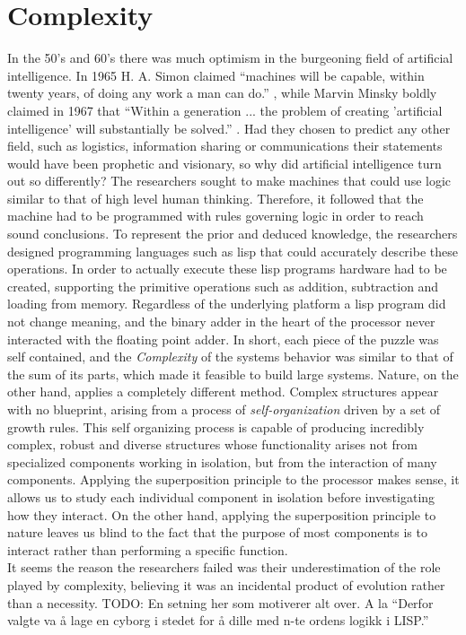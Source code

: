 \section{Complexity}
In the 50's and 60's there was much optimism in the burgeoning field of
artificial intelligence. In 1965 H. A. Simon claimed ``machines will be capable,
within twenty years, of doing any work a man can
do.''\cite{vardi_artificial_nodate} , while Marvin Minsky boldly claimed in 1967
that ``Within a generation ... the problem of creating 'artificial intelligence'
will substantially be solved.'' \cite{noauthor_marvin_nodate}.
Had they chosen to predict any other field, such as logistics, information
sharing or communications their statements would have been prophetic and
visionary, so why did artificial intelligence turn out so differently?
%
The researchers sought to make machines that could use logic similar to that of
high level human thinking.
%
Therefore, it followed that the machine had to be programmed with rules
governing logic in order to reach sound conclusions.
%
To represent the prior and deduced knowledge, the researchers designed
programming languages such as lisp that could accurately describe these
operations.
%
In order to actually execute these lisp programs hardware had to be created,
supporting the primitive operations such as addition, subtraction and loading
from memory.
%
Regardless of the underlying platform a lisp program did not change meaning, and
the binary adder in the heart of the processor never interacted with the
floating point adder. In short, each piece of the puzzle was self contained,
and the \emph{Complexity} of the systems behavior was similar to that of the sum
of its parts, which made it feasible to build large systems.
%
Nature, on the other hand, applies a completely different method.
Complex structures appear with no blueprint, arising from a process of
\emph{self-organization} driven by a set of growth rules. This self organizing
process is capable of producing incredibly complex, robust and diverse
structures whose functionality arises not from specialized components working in
isolation, but from the interaction of many components.
%
Applying the superposition principle to the processor makes sense, it allows us
to study each individual component in isolation before investigating how they
interact.
%
On the other hand, applying the superposition principle to nature leaves us
blind to the fact that the purpose of most components is to interact rather than
performing a specific function.\\
It seems the reason the researchers failed was their underestimation of the role
played by complexity, believing it was an incidental product of evolution rather
than a necessity.
TODO: En setning her som motiverer alt over. A la ``Derfor valgte va å lage en
cyborg i stedet for å dille med n-te ordens logikk i LISP.''

